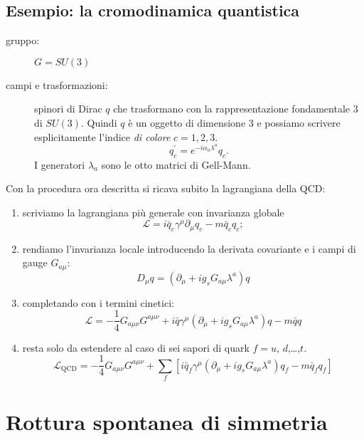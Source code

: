 \documentclass[italian,a4paper]{article}
\theoremstyle{definition}
\newcommand{\lagr}{\ensuremath{\mathscr{L}}}
\newcommand{\dimu}{\ensuremath{\partial_{\mu}}}
\newcommand{\Dimu}{\ensuremath{D_{\mu}}}
\begin{document}
\subsection{Esempio: la cromodinamica quantistica}\label{qcd}
\begin{description}
    \item[gruppo:] $G = SU(3)$
    \item[campi e trasformazioni:] spinori di Dirac $q$ che trasformano con la
        rappresentazione fondamentale $3$ di $SU(3)$. Quindi $q$ \`e un
        oggetto di dimensione $3$ e possiamo scrivere esplicitamente
        l'indice \emph{di colore} $c = 1, 2, 3$. 
        \begin{equation*}
            q_c^\prime = e^{-i \alpha_a \lambda^a}q_c.
        \end{equation*} I generatori $\lambda_a$ sono le otto matrici di
        Gell-Mann.
\end{description}
Con la procedura ora descritta si ricava subito la lagrangiana della QCD:
\begin{enumerate}
    \item scriviamo la lagrangiana pi\`u generale con invarianza globale
        \begin{equation*}
            \lagr = i \bar{q}_c\gamma^\mu\dimu q_c - m
            \bar{q}_c q_c;
        \end{equation*}
    \item rendiamo l'invarianza locale introducendo la derivata covariante e
        i campi di gauge $G_{a\mu}$:
        \begin{equation*}
            \Dimu q = (\dimu + i g_s G_{a\mu}\lambda^a)q
        \end{equation*}
\item completando con i termini cinetici:
    \begin{equation*}
        \lagr = - \dfrac{1}{4}G_{a\mu\nu}G^{a\mu\nu} + i \bar q
        \gamma^\mu(\dimu + i g_s G_{a\mu}\lambda^a)q - m \bar q q
    \end{equation*}
\item resta solo da estendere al caso di sei sapori di quark $f = u$,
    $d$,\dots,$t$.
    \begin{equation*}
        \lagr_{\text{QCD}} = - \dfrac{1}{4}G_{a\mu\nu}G^{a\mu\nu} + \sum_f[i
        \bar q_f
        \gamma^\mu(\dimu + i g_s G_{a\mu}\lambda^a)q_f - m \bar q_f q_f]         
    \end{equation*}
\end{enumerate}
\section{Rottura spontanea di simmetria}
\end{document}
